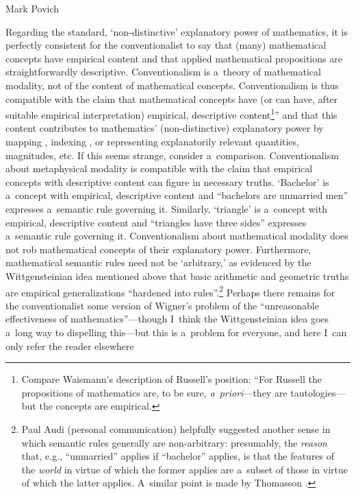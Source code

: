 \begin{artengenv}{Mark Povich}
{Regarding the standard, ‘non-distinctive' explanatory power of mathematics, it is perfectly consistent for the conventionalist to say that (many) mathematical concepts have empirical content and that applied mathematical propositions are straightforwardly descriptive. Conventionalism is a~theory of mathematical modality, not of the content of mathematical concepts. Conventionalism is thus compatible with the claim that mathematical concepts have (or can have, after suitable empirical interpretation) empirical, descriptive content\footnote{Compare Waismann's
\parencite*[][p.66]{shanker_nature_1986} %
 description of Russell's position: ``For Russell the propositions of mathematics are, to be sure, \textit{a~priori}---they are tautologies---but the concepts are empirical.}'' and that this content contributes to mathematics' (non-distinctive) explanatory power by mapping 
\parencites[][]{pincock_mathematics_2011}[][]{bueno_applying_2018}, %
 indexing 
\parencite[][]{melia_weaseling_2000}, %
 or representing 
\parencite[][]{saatsi_enhanced_2011} %
 explanatorily relevant quantities, magnitudes, etc. If this seems strange, consider a~comparison. Conventionalism about metaphysical modality is compatible with the claim that empirical concepts with descriptive content can figure in necessary truths. ‘Bachelor' is a~concept with empirical, descriptive content and ``bachelors are unmarried men'' expresses a~semantic rule governing it. Similarly, ‘triangle' is a~concept with empirical, descriptive content and ``triangles have three sides'' expresses a~semantic rule governing it. Conventionalism about mathematical modality does not rob mathematical concepts of their explanatory power. Furthermore, mathematical semantic rules need not be ‘arbitrary,' as evidenced by the Wittgensteinian idea mentioned above that basic arithmetic and geometric truths are empirical generalizations ``hardened into rules''.\footnote{Paul Audi (personal communication) helpfully suggested another sense in which semantic rules generally are non-arbitrary: presumably, the \textit{reason} that, e.g., ``unmarried'' applies if ``bachelor'' applies, is that the features of the \textit{world} in virtue of which the former applies are a~subset of those in virtue of which the latter applies. A~similar point is made by Thomasson 
\parencite*[][p.70]{thomasson_ordinary_2007}.%
} Perhaps there remains for the conventionalist some version of Wigner's 
\parencite*[][]{wigner_unreasonable_1960} %
 problem of the ``unreasonable effectiveness of mathematics''---though I~think the Wittgensteinian idea goes a~long way to dispelling this---but this is a~problem for everyone, and here I~can only refer the reader elsewhere 
\parencites[see e.g.,][]{steiner_applicability_1998}{bangu_steiner_2006}{clark_wittgenstein_2017}{bueno_applying_2018}


}
\end{artengenv}
